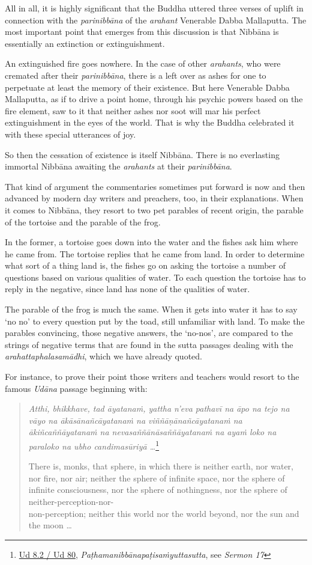 All in all, it is highly significant that the Buddha uttered three verses of uplift in connection with the \emph{parinibbāna} of the \emph{arahant} Venerable Dabba Mallaputta. The most important point that emerges from this discussion is that Nibbāna is essentially an extinction or extinguishment.

An extinguished fire goes nowhere. In the case of other \emph{arahants}, who were cremated after their \emph{parinibbāna}, there is a left over as ashes for one to perpetuate at least the memory of their existence. But here Venerable Dabba Mallaputta, as if to drive a point home, through his psychic powers based on the fire element, saw to it that neither ashes nor soot will mar his perfect extinguishment in the eyes of the world. That is why the Buddha celebrated it with these special utterances of joy.

So then the cessation of existence is itself Nibbāna. There is no everlasting immortal Nibbāna awaiting the \emph{arahants} at their \emph{parinibbāna}.

That kind of argument the commentaries sometimes put forward is now and then advanced by modern day writers and preachers, too, in their explanations. When it comes to Nibbāna, they resort to two pet parables of recent origin, the parable of the tortoise and the parable of the frog.

In the former, a tortoise goes down into the water and the fishes ask him where he came from. The tortoise replies that he came from land. In order to determine what sort of a thing land is, the fishes go on asking the tortoise a number of questions based on various qualities of water. To each question the tortoise has to reply in the negative, since land has none of the qualities of water.

The parable of the frog is much the same. When it gets into water it has to say `no no' to every question put by the toad, still unfamiliar with land. To make the parables convincing, those negative answers, the `no-nos', are compared to the strings of negative terms that are found in the sutta passages dealing with the \emph{arahattaphalasamādhi}, which we have already quoted.

For instance, to prove their point those writers and teachers would resort to the famous \emph{Udāna} passage beginning with:

\begin{quote}
\emph{Atthi, bhikkhave, tad āyatanaṁ, yattha n'eva pathavī na āpo na tejo na vāyo na ākāsānañcāyatanaṁ na viññāṇānañcāyatanaṁ na ākiñcaññāyatanaṁ na nevasaññānāsaññāyatanaṁ na ayaṁ loko na paraloko na ubho candimasūriyā \ldots{}}\footnote{\href{https://suttacentral.net/ud8.2/pli/ms}{Ud 8.2 / Ud 80}, \emph{Paṭhamanibbānapaṭisaṁyuttasutta}, see \emph{Sermon 17}}

There is, monks, that sphere, in which there is neither earth, nor water, nor fire, nor air; neither the sphere of infinite space, nor the sphere of infinite consciousness, nor the sphere of nothingness, nor the sphere of neither-perception-nor-\\ non-perception; neither this world nor the world beyond, nor the sun and the moon \ldots{}
\end{quote}

